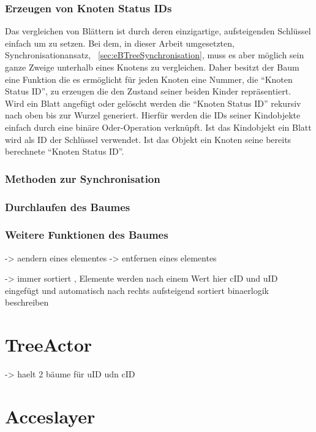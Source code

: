 \documentclass[a4paper,11pt,oneside,%
headsepline,												%
footsepline,												%
bibtotocnumbered									%
]{scrreprt}
\begin{document}
\subsubsection{Erzeugen von Knoten Status IDs}
Das vergleichen von Blättern ist durch deren einzigartige, aufsteigenden Schlüssel einfach um zu setzen. Bei dem, in dieser Arbeit umgesetzten, Synchronisationansatz, ~\autoref{sec:eBTreeSynchronisation}, muss es aber möglich sein ganze Zweige unterhalb eines Knotens zu vergleichen. Daher besitzt der Baum eine Funktion die es ermöglicht für jeden Knoten eine Nummer, die \enquote{Knoten Status ID}, zu erzeugen die den Zustand seiner beiden Kinder repräsentiert.\\
Wird ein Blatt angefügt oder gelöscht werden die \enquote{Knoten Status ID} rekursiv nach oben bis zur Wurzel generiert. Hierfür werden die IDs seiner Kindobjekte einfach durch eine binäre Oder-Operation verknüpft. Ist das Kindobjekt ein Blatt wird als ID der Schlüssel verwendet. Ist das Objekt ein Knoten seine bereits berechnete \enquote{Knoten Status ID}. 

\subsubsection{Methoden zur Synchronisation}

\subsubsection{Durchlaufen des Baumes}

\subsubsection{Weitere Funktionen des Baumes}
-> aendern eines elementes 
-> entfernen eines elementes


-> immer sortiert , Elemente werden nach einem Wert hier cID und uID eingefügt und automatisch nach rechts aufsteigend sortiert
binaerlogik beschreiben




	\section{TreeActor}
-> haelt 2 bäume für uID udn cID

\section{Acceslayer}
\end{document}
